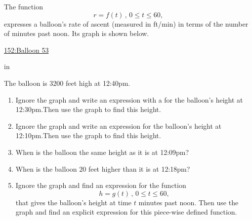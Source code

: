 \documentclass{ximera}
\newcommand{\pskip}{\vskip 0.1 in}
\begin{document}
\begin{question} \label{EdfdhUERr3rDR}
The function 
\[
    r = f(t) \, , \, 0\leq t \leq  60 , 
\]
expresses a balloon's rate of ascent (measured in ft/min) in terms of the number of minutes past noon. Its graph is shown below.

\begin{onlineOnly}
    \begin{center}
\end{center}
\end{onlineOnly}

\href{https://www.desmos.com/calculator/vfk9toeayo}{152:Balloon 53}

\pskip

The balloon is $3200$ feet high at 12:40pm.

\begin{enumerate}
\item Ignore the graph and write an expression with a for the balloon's height at 12:30pm.Then use the graph to find this height.

\item Ignore the graph and write an expression for the balloon's height at 12:10pm.Then use the graph to find this height.

\item When is the balloon the same height as it is at 12:09pm?

\item When is the balloon $20$ feet higher than it is at 12:18pm?


\item Ignore the graph and find an expression for the function 
\[
         h=g(t) \, , \, 0\leq t \leq 60, 
\]
that gives the balloon's height at time $t$ minutes past noon. Then use the graph and find an explicit expression for this piece-wise defined function.
\end{enumerate}
\end{question}
\end{document}
